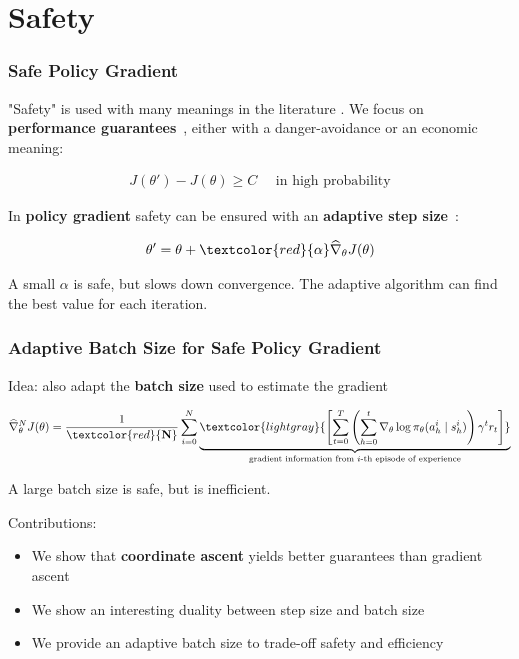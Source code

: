 \documentclass{beamer}
\begin{document}
\section{Safety}


\begin{frame}
\frametitle{Safe Policy Gradient}

"Safety" is used with many meanings in the literature \cite{garcia2015comprehensive}. We focus on \textbf{performance guarantees}~\cite{kakade2002approximately, thomas2015high}, either with a danger-avoidance or an economic meaning:

\begin{align*}
	J(\theta') - J(\theta) \geq C \quad\text{ in high probability}
\end{align*}

In \textbf{policy gradient} safety can be ensured with an \textbf{adaptive step size}~\cite{pirotta2013adaptive}:

\begin{align*}
	\theta' = \theta + \textcolor{red}{\mathbf{\alpha}}\widehat{\nabla}_{\theta}J(\theta)
\end{align*}

A small $\alpha$ is safe, but slows down convergence. The adaptive algorithm can find the best value for each iteration. 

\end{frame}


\begin{frame}
\frametitle{Adaptive Batch Size for Safe Policy Gradient~\cite{papini2017adaptive}}
Idea: also adapt the \textbf{batch size} used to estimate the gradient

\begin{align*}
	\widehat{\nabla}_{\theta}^NJ(\theta) = \frac{1}{\textcolor{red}{\mathbf{N}}}\sum_{i=0}^{N}\underbrace{\textcolor{lightgray}{\left[\sum_{t=0}^T\left(\sum_{h=0}^t\nabla_{\theta}\log\pi_{\theta}(a_h^i\mid s_h^i)\right) \gamma^tr_t\right]}}_{\text{gradient information from $i$-th episode of experience}}
\end{align*}

A large batch size is safe, but is inefficient.

\vfill

Contributions:
\begin{itemize}
	\item We show that \textbf{coordinate ascent} yields better guarantees than gradient ascent
	\item We show an interesting duality between step size and batch size
	\item We provide an adaptive batch size to trade-off safety and efficiency
\end{itemize}

\end{frame}
\end{document}
